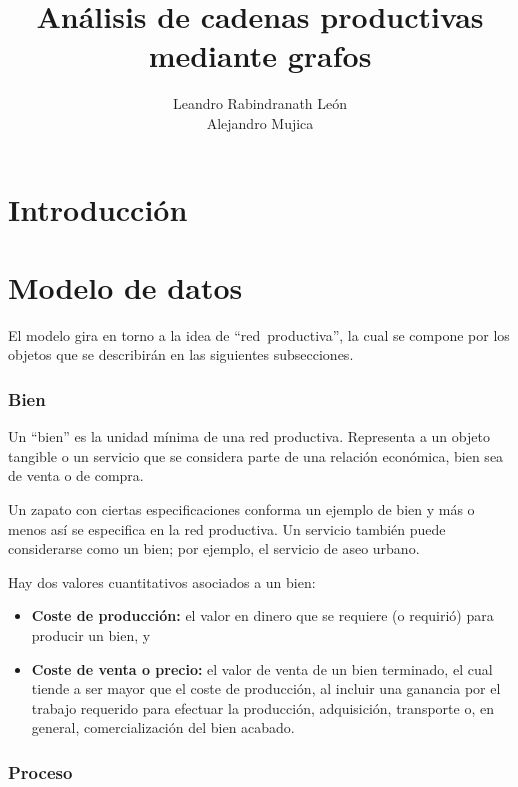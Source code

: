 \documentclass[11pt,spanish,letter]{article}
\title{Análisis de cadenas productivas mediante grafos}
\author{Leandro Rabindranath León \\ Alejandro Mujica }
\begin{document}
 \maketitle
 
 \tableofcontents

 \section{Introducción}


 \section{Modelo de datos}

 El modelo gira en torno a la idea de ``red~productiva'', la cual se
 compone por los objetos que se describirán en las siguientes
 subsecciones.

   \subsubsection{Bien}

   Un ``bien'' es la unidad mínima de una red productiva. Representa a un
   objeto tangible o un servicio que se considera parte de una relación
   económica, bien sea de venta o de compra.

   Un zapato con ciertas especificaciones conforma un ejemplo de bien y
   más o menos así se especifica en la red productiva. Un servicio
   también puede considerarse como un bien; por ejemplo, el servicio de
   aseo urbano.

   Hay dos valores cuantitativos asociados a un bien:
   \begin{itemize}
    \item {\bf Coste de producción:} el valor en dinero que se requiere
	  (o requirió) para producir un bien, y

    \item {\bf Coste de venta o precio:} el valor de venta de un bien
	  terminado, el cual tiende a ser mayor que el coste de
	  producción, al incluir una ganancia  por el trabajo
	  requerido para efectuar la producción, adquisición, transporte o,
	  en general, comercialización del bien acabado.
   \end{itemize}


   \subsubsection{Proceso}
\end{document}
